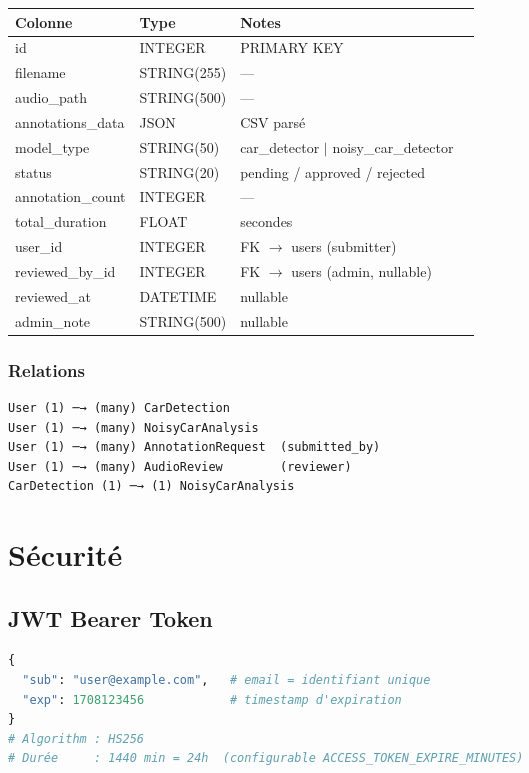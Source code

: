 \documentclass[11pt,a4paper]{article}
\begin{document}
\begin{table}[htbp]
\centering
\begin{tabular}{@{}llll@{}}
\toprule
\textbf{Colonne} & \textbf{Type} & \textbf{Notes} \\
\midrule
id & INTEGER & PRIMARY KEY \\
filename & STRING(255) & — \\
audio\_path & STRING(500) & — \\
annotations\_data & JSON & CSV parsé \\
model\_type & STRING(50) & car\_detector $|$ noisy\_car\_detector \\
status & STRING(20) & pending / approved / rejected \\
annotation\_count & INTEGER & — \\
total\_duration & FLOAT & secondes \\
user\_id & INTEGER & FK $\rightarrow$ users (submitter) \\
reviewed\_by\_id & INTEGER & FK $\rightarrow$ users (admin, nullable) \\
reviewed\_at & DATETIME & nullable \\
admin\_note & STRING(500) & nullable \\
\bottomrule
\end{tabular}
\end{table}

\subsubsection{Relations}

\begin{lstlisting}[style=tree]
User (1) ─→ (many) CarDetection
User (1) ─→ (many) NoisyCarAnalysis
User (1) ─→ (many) AnnotationRequest  (submitted_by)
User (1) ─→ (many) AudioReview        (reviewer)
CarDetection (1) ─→ (1) NoisyCarAnalysis
\end{lstlisting}

\section{Sécurité}

\subsection{JWT Bearer Token}

\begin{lstlisting}[language=Python,caption={Payload JWT}]
{
  "sub": "user@example.com",   # email = identifiant unique
  "exp": 1708123456            # timestamp d'expiration
}
# Algorithm : HS256
# Durée     : 1440 min = 24h  (configurable ACCESS_TOKEN_EXPIRE_MINUTES)
\end{lstlisting}
\end{document}
